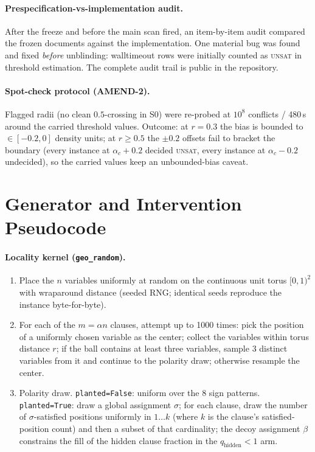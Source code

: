 \documentclass[pdflatex,sn-basic,Numbered]{sn-jnl}
\begin{document}
\begin{appendices}
\paragraph{Prespecification-vs-implementation audit.}
After the freeze and before the main scan fired, an item-by-item audit
compared the frozen documents against the implementation. One material bug
was found and fixed \emph{before} unblinding: walltimeout rows were initially
counted as \textsc{unsat} in threshold estimation. The complete audit trail
is public in the repository.

\paragraph{Spot-check protocol (AMEND-2).}
Flagged radii (no clean $0.5$-crossing in S0) were re-probed at $10^8$
conflicts / 480\,s around the carried threshold values. Outcome: at $r=0.3$
the bias is bounded to $\in[-0.2,0]$ density units; at $r\ge0.5$ the
$\pm0.2$ offsets fail to bracket the boundary (every instance at
$\alpha_c+0.2$ decided \textsc{unsat}, every instance at $\alpha_c-0.2$
undecided), so the carried values keep an unbounded-bias caveat.

\section{Generator and Intervention Pseudocode}
\label{app:pseudo}

\paragraph{Locality kernel (\texttt{geo\_random}).}
\begin{enumerate}
    \item Place the $n$ variables uniformly at random on the continuous unit
    torus $[0,1)^2$ with wraparound distance (seeded RNG; identical seeds
    reproduce the instance byte-for-byte).
    \item For each of the $m = \alpha n$ clauses, attempt up to 1000 times:
    pick the position of a uniformly chosen variable as the center; collect
    the variables within torus distance
    $r$; if the ball contains at least three variables, sample 3 distinct
    variables from it and continue to the polarity draw; otherwise resample
    the center.
    \item Polarity draw. \texttt{planted=False}: uniform over the 8 sign
    patterns. \texttt{planted=True}: draw a global assignment $\sigma$; for
    each clause, draw the number of $\sigma$-satisfied positions uniformly
    in $1\ldots k$ (where $k$ is the clause's satisfied-position count) and
    then a subset of that cardinality; the decoy assignment $\beta$
    constrains the fill of the hidden clause fraction in the
    $q_{\text{hidden}}<1$ arm.
\end{enumerate}


\end{appendices}
\end{document}
